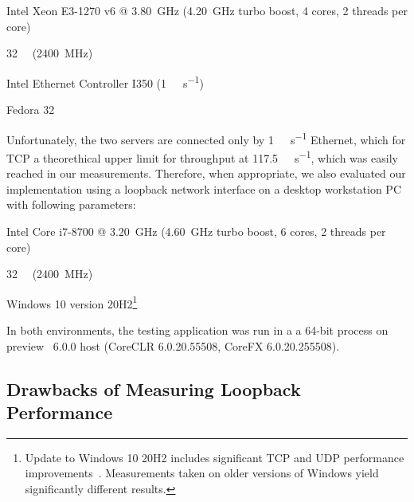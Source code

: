 \begin{itemize}

         Intel\textsuperscript{\textregistered{}} Xeon\textsuperscript{\textregistered{}}
        E3-1270 v6 @ \SI{3.80}{\giga\hertz} (\SI{4.20}{\giga\hertz} turbo boost, 4 cores, 2 threads
        per core)

         \SI{32}{\giga\byte} (\SI{2400}{\mega\hertz})

         Intel\textsuperscript{\textregistered{}} Ethernet Controller
        I350 (\SI[per-mode=symbol]{1}{\giga\bit\per\second})

         Fedora 32

\end{itemize}

Unfortunately, the two servers are connected only by \SI[per-mode=symbol]{1}{\giga\bit\per\second}
Ethernet, which for TCP a theorethical upper limit for throughput at
\SI[per-mode=symbol]{117.5}{\mega\byte\per\second}, which was easily reached in our measurements.
Therefore, when appropriate, we also evaluated our implementation using a loopback network interface
on a desktop workstation PC with following parameters:

\begin{itemize}

         Intel\textsuperscript{\textregistered{}} Core\textsuperscript{\textregistered{}}
        i7-8700 @ \SI{3.20}{\giga\hertz} (\SI{4.60}{\giga\hertz} turbo boost, 6 cores, 2 threads per
        core)

         \SI{32}{\giga\byte} (\SI{2400}{\mega\hertz})

         Windows 10 version 20H2\footnote{Update to Windows 10 20H2 includes significant
        TCP and UDP performance improvements~\cite{theregister20h2}. Measurements taken on older
        versions of Windows yield significantly different results.}

\end{itemize}

In both environments, the testing application was run in a a 64-bit process on preview
\dotnet{}~6.0.0 host (CoreCLR 6.0.20.55508, CoreFX 6.0.20.255508).

\subsection{Drawbacks of Measuring Loopback Performance}\label{sec:04-localhost-mtu}

